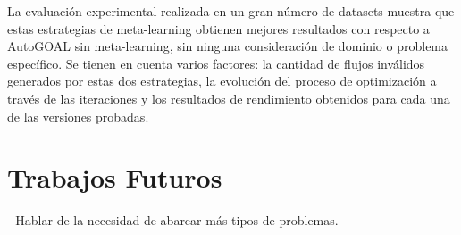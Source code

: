 \begin{conclusions}
La evaluación experimental realizada en un gran número de datasets muestra que estas estrategias de meta-learning obtienen mejores resultados con respecto a AutoGOAL sin meta-learning, sin ninguna consideración de dominio o problema específico. Se tienen en cuenta varios factores: la cantidad de flujos inválidos generados por estas dos estrategias, la evolución del proceso de optimización a través de las iteraciones y los resultados de rendimiento obtenidos para cada una de las versiones probadas.

\section{Trabajos Futuros}

- Hablar de la necesidad de abarcar más tipos de problemas. 
- 

\end{conclusions}
